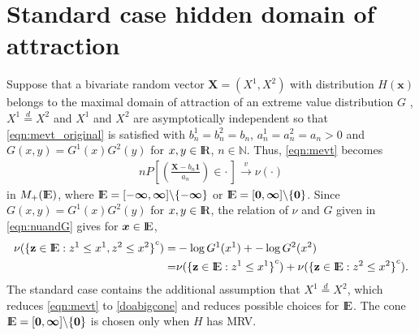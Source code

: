 \documentclass[11 pt]{amsart}
\numberwithin{equation}{section}
\begin{document}
\section{Standard case {hidden domain of attraction }}\label{sec:standard}
Suppose that a bivariate random vector ${\boldsymbol X} = (X^1, X^2) $ with
distribution $H({\boldsymbol x})$
belongs to the maximal domain of attraction of an extreme value
distribution $G$ \citep[page 265]{resnickbook:2008}, $X^1
\stackrel{d}{=} X^2$  and $X^1$ and $X^2$ are asymptotically
independent so that \eqref{eqn:mevt_original} is satisfied  with
$b^1_n = b^2_n = b_n$, $a^1_n = a^2_n = a_n{>0}$ and $G(x, y) =
G^1(x)G^2(y)$ for $x, y \in {\mathop{\rm I\kern -0.20em R}\nolimits}$, $n \in \mathbb{N}$. Thus,
\eqref{eqn:mevt} becomes  
\begin{align}\label{doabigcone}
nP\left[ \left( \frac{{\boldsymbol X} - b_n{\boldsymbol 1}}{a_n} \right) \in \cdot \, \right] \stackrel{v}{\rightarrow} \nu(\cdot)
\end{align}
in $M_+({\mathop{\rm I\kern -0.20em E}\nolimits})$, where ${\mathop{\rm I\kern -0.20em E}\nolimits} = [-{\boldsymbol \infty}, {\boldsymbol \infty}] \backslash \{ -{\boldsymbol \infty}
\}$ or ${\mathop{\rm I\kern -0.20em E}\nolimits} = {[{\boldsymbol 0}, {\boldsymbol \infty}]} \backslash \{ {\boldsymbol 0} \}$. Since $G(x,
y) = G^1(x)G^2(y)$ for $x, y \in {\mathop{\rm I\kern -0.20em R}\nolimits}$, the relation of $\nu$ and
$G$ given in \eqref{eqn:nuandG} gives for ${\boldsymbol x} \in {\mathop{\rm I\kern -0.20em E}\nolimits}$, 
\begin{align}\label{eqn:nustructure}
\nu( {\{{\bf{z}} \in {\mathop{\rm I\kern -0.20em E}\nolimits}: z^1 \le x^1, z^2 \le x^2\} }^c ) =&
-\log G^1(x^1) +  -\log G^2(x^2)\nonumber \\
=& \nu( {\{{\bf{z}} \in {\mathop{\rm I\kern -0.20em E}\nolimits}: z^1 \le x^1\} }^c ) + \nu( {\{{\bf{z}} \in {\mathop{\rm I\kern -0.20em E}\nolimits}: z^2 \le x^2\} }^c ).
\end{align} 
{T}he {standard case contains the}  additional assumption that
$X^1 \stackrel{d}{=} X^2$, which reduces \eqref{eqn:mevt} to
\eqref{doabigcone} and reduces  possible choices for ${\mathop{\rm I\kern -0.20em E}\nolimits}$. The cone
${\mathop{\rm I\kern -0.20em E}\nolimits} = {[{\boldsymbol 0}, {\boldsymbol \infty}]} \backslash \{ {\boldsymbol 0}\}$ is chosen only when $H$
has MRV.  
\end{document}
